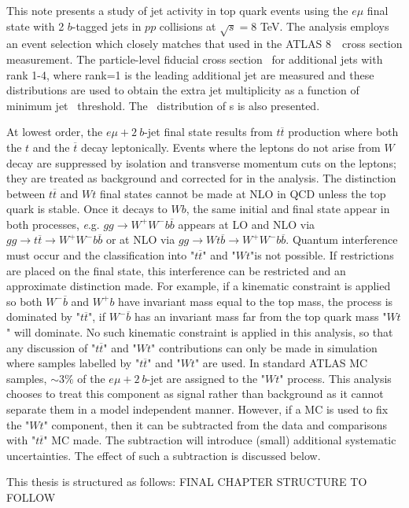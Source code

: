 This note presents a study of jet activity in top quark events using the $e\mu$ final state 
with 2 $b$-tagged jets in $pp$ collisions at $\sqrt{s}=8$ TeV. The analysis employs
an event selection which closely matches that used in the ATLAS 8~\TeV\ cross
section measurement\cite{xsec}.
The particle-level fiducial cross section \sigmapti\ for additional jets with 
rank 1-4, where rank=1  is the leading additional jet are measured and
these distributions are used to obtain the extra jet multiplicity as a function of minimum jet \pt\ threshold. 
The \pt\ distribution of \bjet s is also presented.

At lowest order, the $e\mu+2\ b$-jet final state results from $t\overline t$ production where both the 
$t$ and the $\overline t$  decay leptonically.  
Events where the leptons do not arise from $W$ decay are suppressed by isolation and
transverse momentum cuts on the leptons; they are treated as background and corrected for in the analysis.
The distinction between $t\overline{t}$ and $Wt$ final states cannot be made at NLO in QCD unless the top quark is stable.
Once it decays to $Wb$, the same initial and final state appear in both processes,
{\textit e.g.} $gg\to W^+W^- b \overline{b}$ appears at LO and NLO via $gg\to  t\overline{t}\to W^+W^- b \overline{b}$ or
at NLO via  $gg\to  Wt\overline{b} \to W^+W^- b \overline{b}$.
Quantum interference must occur and the classification into
"$t\overline{t}$" and "$Wt$"is not possible. If restrictions are placed on the final state,
 this interference can be restricted and an approximate distinction made. For example,
if a kinematic constraint is applied so both  $W^-\overline{b}$ and  $W^+ b$
have invariant mass equal to the top mass, 
the process is dominated by "$t\overline{t}$", if  $W^-\overline{b}$ has an invariant mass
far from the top quark mass "$Wt$" will dominate.
No such kinematic constraint is applied in this analysis, so that any discussion of  "$t\overline{t}$" 
and "$Wt$" contributions can only be made in simulation where samples labelled by 
 "$t\overline{t}$" and "$Wt$" are used.  In standard ATLAS MC samples, $\sim 3\%$ of the 
$e\mu+2\ b$-jet are assigned to the "$Wt$" process.  This analysis chooses to treat this
component as signal rather than background as it cannot separate them in a model independent manner. However, if a MC is used to fix the
 "$Wt$" component, then it can be subtracted from the data and comparisons with "$t\overline{t}$" MC made. The subtraction will 
introduce (small) additional systematic uncertainties. The effect of such a subtraction is discussed below.

This thesis is structured as follows: FINAL CHAPTER STRUCTURE TO FOLLOW